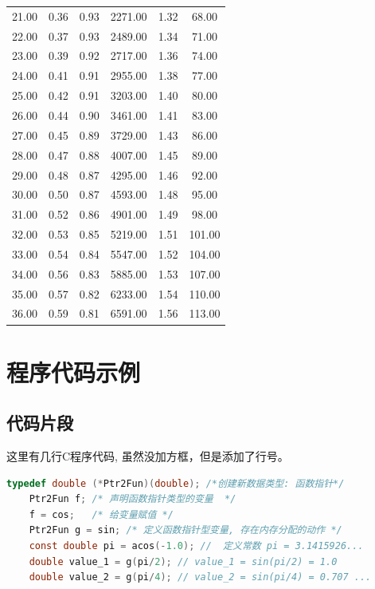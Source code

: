 \begin{landscape}
\begin{longtable}{cm{4cm}ccp{4cm}c}
		21.00 & 0.36 & 0.93 & 2271.00 & 1.32 & 68.00\\
		22.00 & 0.37 & 0.93 & 2489.00 & 1.34 & 71.00\\
		23.00 & 0.39 & 0.92 & 2717.00 & 1.36 & 74.00\\
		24.00 & 0.41 & 0.91 & 2955.00 & 1.38 & 77.00\\
		25.00 & 0.42 & 0.91 & 3203.00 & 1.40 & 80.00\\
		26.00 & 0.44 & 0.90 & 3461.00 & 1.41 & 83.00\\
		27.00 & 0.45 & 0.89 & 3729.00 & 1.43 & 86.00\\
		28.00 & 0.47 & 0.88 & 4007.00 & 1.45 & 89.00\\
		29.00 & 0.48 & 0.87 & 4295.00 & 1.46 & 92.00\\
		30.00 & 0.50 & 0.87 & 4593.00 & 1.48 & 95.00\\
		31.00 & 0.52 & 0.86 & 4901.00 & 1.49 & 98.00\\
		32.00 & 0.53 & 0.85 & 5219.00 & 1.51 & 101.00\\
		33.00 & 0.54 & 0.84 & 5547.00 & 1.52 & 104.00\\
		34.00 & 0.56 & 0.83 & 5885.00 & 1.53 & 107.00\\
		35.00 & 0.57 & 0.82 & 6233.00 & 1.54 & 110.00\\
		36.00 & 0.59 & 0.81 & 6591.00 & 1.56 & 113.00\\
		\hline
	\end{longtable}
\end{landscape}
\newpage 

\section{程序代码示例}

\subsection{代码片段}
这里有几行C程序代码, 虽然没加方框，但是添加了行号。
\begin{lstlisting}[language=C]
	typedef double (*Ptr2Fun)(double); /*创建新数据类型: 函数指针*/
	Ptr2Fun f; /* 声明函数指针类型的变量  */
	f = cos;   /* 给变量赋值 */
	Ptr2Fun g = sin; /* 定义函数指针型变量, 存在内存分配的动作 */
	const double pi = acos(-1.0); //  定义常数 pi = 3.1415926... 
	double value_1 = g(pi/2); // value_1 = sin(pi/2) = 1.0  
	double value_2 = g(pi/4); // value_2 = sin(pi/4) = 0.707 ... 
\end{lstlisting}

